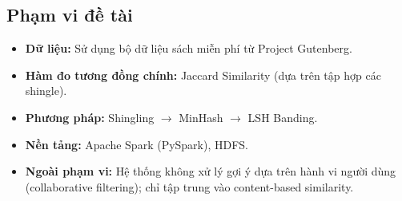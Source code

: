 \subsection{Phạm vi đề tài}

\begin{itemize}
    \item \textbf{Dữ liệu:} Sử dụng bộ dữ liệu sách miễn phí từ Project Gutenberg.
    \item \textbf{Hàm đo tương đồng chính:} Jaccard Similarity (dựa trên tập hợp các shingle).
    \item \textbf{Phương pháp:} Shingling $\rightarrow$ MinHash $\rightarrow$ LSH Banding.
    \item \textbf{Nền tảng:} Apache Spark (PySpark), HDFS.
    \item \textbf{Ngoài phạm vi:} Hệ thống không xử lý gợi ý dựa trên hành vi người dùng (collaborative filtering); chỉ tập trung vào content-based similarity.
\end{itemize}

